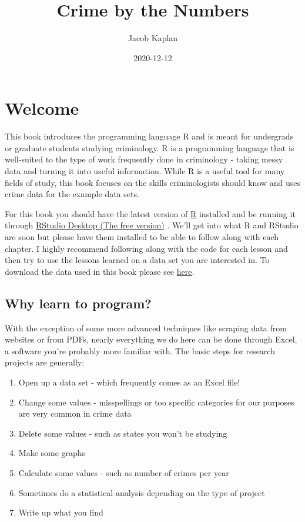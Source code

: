 \documentclass[
  12pt,
]{book}
\title{Crime by the Numbers}
\author{Jacob Kaplan}
\date{2020-12-12}
\providecommand{\tightlist}{%
  \setlength{\itemsep}{0pt}\setlength{\parskip}{0pt}}
\begin{document}
\maketitle

{
\hypersetup{linkcolor=}
\setcounter{tocdepth}{2}
\tableofcontents
}
\hypertarget{welcome}{%
\chapter*{Welcome}\label{welcome}}


This book introduces the programming language R and is meant for undergrads or graduate students studying criminology. R is a programming language that is well-suited to the type of work frequently done in criminology - taking messy data and turning it into useful information. While R is a useful tool for many fields of study, this book focuses on the skills criminologists should know and uses crime data for the example data sets.

For this book you should have the latest version of \href{https://cloud.r-project.org/}{R} installed and be running it through \href{https://www.rstudio.com/products/rstudio/download/}{RStudio Desktop (The free version)} . We'll get into what R and RStudio are soon but please have them installed to be able to follow along with each chapter. I highly recommend following along with the code for each lesson and then try to use the lessons learned on a data set you are interested in. To download the data used in this book please see \href{https://github.com/jacobkap/r4crimz/tree/master/data}{here}.

\hypertarget{why-learn-to-program}{%
\section*{Why learn to program?}\label{why-learn-to-program}}


With the exception of some more advanced techniques like scraping data from websites or from PDFs, nearly everything we do here can be done through Excel, a software you're probably more familiar with. The basic steps for research projects are generally:

\begin{enumerate}
\def\labelenumi{\arabic{enumi}.}
\tightlist
\item
  Open up a data set - which frequently comes as an Excel file!
\item
  Change some values - misspellings or too specific categories for our purposes are very common in crime data
\item
  Delete some values - such as states you won't be studying
\item
  Make some graphs
\item
  Calculate some values - such as number of crimes per year
\item
  Sometimes do a statistical analysis depending on the type of project
\item
  Write up what you find
\end{enumerate}
\end{document}
